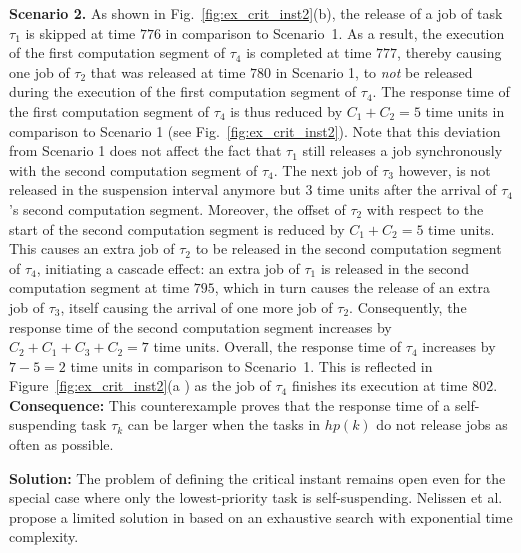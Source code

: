 \noindent\textbf{Scenario 2.} As shown in Fig.~\ref{fig:ex_crit_inst2}(b), the release of a job of task $\tau_1$ is skipped at time $776$ in comparison to Scenario~1. As a result, the execution of the first computation segment of $\tau_4$ is completed at time $777$, thereby causing one job of $\tau_2$ that was released at time $780$ in Scenario 1, to \emph{not} be released during the execution of the first computation segment of $\tau_4$. The response time of the first computation segment of $\tau_4$ is thus reduced by $C_1 + C_2 = 5$ time units in comparison to Scenario 1 (see Fig.~\ref{fig:ex_crit_inst2}). Note that this deviation from Scenario 1 does not affect the fact that $\tau_1$ still releases a job synchronously with the second computation segment of $\tau_4$. The next job of $\tau_3$ however, is not released in the suspension interval anymore but $3$ time units after the arrival of $\tau_4$'s second computation segment. Moreover, the offset of $\tau_2$ with respect to the start of the second computation segment is reduced by $C_1 + C_2 = 5$ time units. This causes an extra job of $\tau_2$ to be released in the second computation segment of $\tau_4$, initiating a cascade effect: an extra job of $\tau_1$ is released in the second computation segment at time $795$, which in turn causes the release of an extra job of $\tau_3$, itself causing the arrival of one more job of $\tau_2$. Consequently, the response time of the second computation segment increases by $C_2 + C_1 + C_3 + C_2 = 7$ time units. Overall, the response time of $\tau_4$ increases by $7 - 5 = 2$ time units in comparison to Scenario~1. This is reflected in Figure~\ref{fig:ex_crit_inst2}(a ) as the job of $\tau_4$ finishes its execution at time $802$.\\


{\bf Consequence:} This counterexample proves that the response time of a self-suspending task $\tau_k$ can be larger when the tasks in $hp(k)$ do not release jobs as often as possible.

{\bf Solution:} The problem of defining the critical instant remains open even for the special case where only the lowest-priority task is self-suspending. Nelissen et al. propose a limited solution in \cite{ecrts15nelissen} based on an exhaustive search with exponential time complexity.

\label{sec:wrong-highest-priority}

